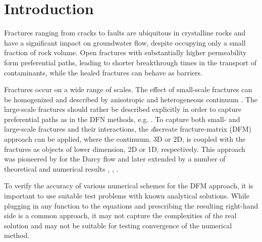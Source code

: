\documentclass[sn-mathphys,Numbered]{sn-jnl}
\begin{document}




\maketitle
\section{Introduction}
Fractures ranging from cracks to faults are ubiquitous in crystalline rocks and have a significant impact on groundwater flow, despite occupying only a small fraction of rock volume. Open fractures with substantially higher permeability form preferential paths, leading to shorter breakthrough times in the transport of contaminants, while the healed fractures can behave as barriers.

Fractures occur on a wide range of scales. The effect of small-scale fractures can be homogenized and described by anisotropic and heterogeneous continuum \cite{Bogdanov2007Effective}. The large-scale fractures should rather be described explicitly in order to capture preferential paths
as in the DFN methods, e.g. \cite{Elmo_Discrete_2014a}. 
To capture both small- and large-scale fractures and their interactions, the {\emph discreate fracture-matrix} (DFM)  approach can be applied, where the continuum, 3D or 2D, is coupled with the fractures as objects of lower dimension, 2D or 1D, respectively. This approach was pioneered
by \cite{Martin2005} for the Darcy flow and later extended by a number of theoretical and numerical results \cite{Angot2009a}, \cite{fumagalli_numerical_2011}, \cite{brezina_analysis_2015}.  


To verify the accuracy of various numerical schemes for the DFM approach, it is important to use suitable test problems with known analytical solutions. While plugging in any function to the equations and prescribing the resulting right-hand side is a common approach, it may not capture the complexities of the real solution and may not be suitable for testing convergence of the numerical method. 
\end{document}
